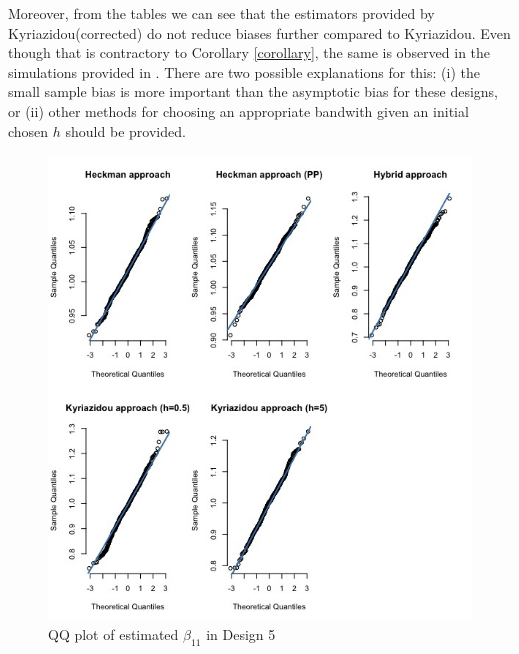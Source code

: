 Moreover, from the tables we can see that the estimators provided by Kyriazidou(corrected) do not reduce biases further compared to Kyriazidou. Even though that is contractory to Corollary \ref{corollary}, the same is observed in the simulations provided in \cite{kyriazidou1997estimation}. There are two possible explanations for this: (i) the small sample bias is more important than the asymptotic bias for these designs, or (ii) other methods for choosing an appropriate bandwith given an initial chosen $h$ should be provided.
\begin{figure}[htbp]
  \vspace{-2.5em}%
  \centerline{\includegraphics[scale=.4]{content/Figures/QQ_beta_11_Design5.png}}
  \caption{\footnotesize{QQ plot of estimated $\beta_{11}$ in Design 5}}
  \label{QQ_beta_11_Design5}
\end{figure}
